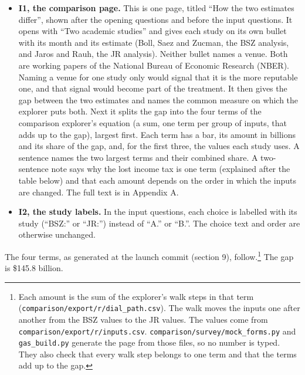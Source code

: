 \begin{itemize}
\tightlist
\item
  \textbf{I1, the comparison page.} This is one page, titled ``How the two estimates differ'', shown after
  the opening questions and before the input questions. It opens with ``Two academic studies'' and gives each
  study on its own bullet with its month and its estimate (Boll, Saez and Zucman, the BSZ analysis, and Jaros and
  Rauh, the JR analysis). Neither bullet names a venue. Both are working papers of the National
  Bureau of Economic Research (NBER). Naming a venue for one study only would signal that it is
  the more reputable one, and that signal would become part of the treatment. It then gives the
  gap between the two estimates and names the common measure on which the explorer puts both.
  Next it splits the gap into the four terms of the comparison explorer's equation (a sum, one
  term per group of inputs, that adds up to the gap), largest first. Each term has a bar, its amount in billions and its share of the gap, and, for
  the first three, the values each study uses. A sentence names the two largest terms and their
  combined share. A two-sentence note says why the lost income tax is one term (explained after the table below) and that
  each amount depends on the order in which the inputs are changed. The full text is in Appendix A.
\item
  \textbf{I2, the study labels.} In the input questions, each choice is labelled with its study (``BSZ:''
  or ``JR:'') instead of ``A.'' or ``B.''. The choice text and order are otherwise unchanged.
\end{itemize}

The four terms, as generated at the launch commit (section 9), follow.\footnote{Each amount is the sum of the explorer's walk steps in that term
  (\texttt{comparison/export/r/dial\_path.csv}). The walk moves the inputs one after another from the BSZ
  values to the JR values. The values come from \texttt{comparison/export/r/inputs.csv}.
  \texttt{comparison/survey/mock\_forms.py} and \texttt{gas\_build.py} generate the page from those files, so no
  number is typed. They also check that every walk step belongs to one term and that the terms
  add up to the gap.} The gap is \$145.8 billion.

